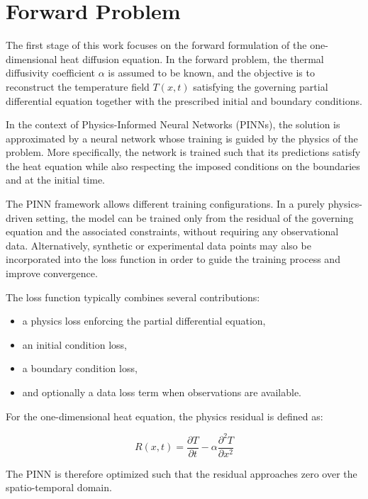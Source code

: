 \section{Forward Problem}

The first stage of this work focuses on the forward formulation of the one-dimensional heat diffusion equation. In the forward problem, the thermal diffusivity coefficient $\alpha$ is assumed to be known, and the objective is to reconstruct the temperature field $T(x,t)$ satisfying the governing partial differential equation together with the prescribed initial and boundary conditions.

In the context of Physics-Informed Neural Networks (PINNs), the solution is approximated by a neural network whose training is guided by the physics of the problem. More specifically, the network is trained such that its predictions satisfy the heat equation while also respecting the imposed conditions on the boundaries and at the initial time.

The PINN framework allows different training configurations. In a purely physics-driven setting, the model can be trained only from the residual of the governing equation and the associated constraints, without requiring any observational data. Alternatively, synthetic or experimental data points may also be incorporated into the loss function in order to guide the training process and improve convergence.

The loss function typically combines several contributions:

\begin{itemize}
    \item a physics loss enforcing the partial differential equation,
    \item an initial condition loss,
    \item a boundary condition loss,
    \item and optionally a data loss term when observations are available.
\end{itemize}

For the one-dimensional heat equation, the physics residual is defined as:

\begin{equation}
R(x,t)
=
\frac{\partial T}{\partial t}
-
\alpha
\frac{\partial^2 T}{\partial x^2}
\end{equation}

The PINN is therefore optimized such that the residual approaches zero over the spatio-temporal domain.

